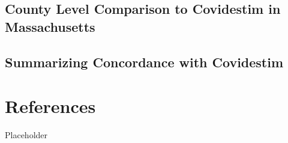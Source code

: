 \documentclass[12pt,twoside]{smiththesis}
\begin{document}
\hypertarget{county-level-comparison-to-covidestim-in-massachusetts}{%
\section{County Level Comparison to Covidestim in Massachusetts}\label{county-level-comparison-to-covidestim-in-massachusetts}}

\hypertarget{summarizing-concordance-with-covidestim-1}{%
\section{Summarizing Concordance with Covidestim}\label{summarizing-concordance-with-covidestim-1}}

\hypertarget{references}{%
\chapter*{References}\label{references}}

Placeholder
\end{document}
